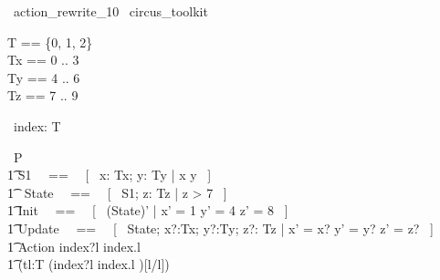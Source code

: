 % 
\begin{zsection}
  \SECTION\ action\_rewrite\_10 \parents\ circus\_toolkit
\end{zsection}

\begin{zed}
    T == \{0, 1, 2\} \\
	Tx == 0 .. 3 \\ 
	Ty == 4 .. 6 \\ 
	Tz == 7 .. 9 \\ 
\end{zed}

\begin{circus}
	\circchannel\ index: T \\
\end{circus}

\begin{circus}
    \circprocess\ P \circdef \circbegin \\
        \t1 S1 ~~==~~ [~  x: Tx; y: Ty | x  \land y  ~] \\
        \t1 \circstate\ State ~~==~~ [~ S1; z: Tz | z > 7 ~] \\
        \t1 Init ~~==~~ [~ (State)' | x' = 1 \land y' = 4 \land z' = 8 ~] \\
        \t1 Update ~~==~~ [~ \Delta State; x?:Tx; y?:Ty; z?: Tz | x' = x? \land y' = y? \land z' = z? ~] \\
        \t1 Action \circdef index?l \then index.l \then \Skip \\
        \t1 \circspot (\circvar tl:T \circspot (index?l \then index.l \then \Skip)[l/l]) \\
	\circend
\end{circus}

